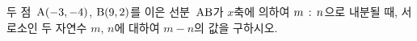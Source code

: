 두 점~$\mathrm{A}(-3{,}\mkern3mu\mathopen{}-4)$, $\mathrm{B}(9{,}\mkern3mu\mathopen{}2)$를 이은 선분~$\mathrm{AB}$가 $x$축에 의하여 $m\mkern3mu :\mkern3mu n$으로 내분될 때, 서로소인 두 자연수 $m$, $n$에 대하여 $m-n$의 값을 구하시오.
